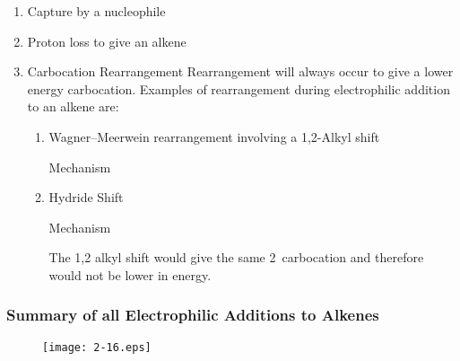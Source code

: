 \begin{enumerate}[label=\alph*)]

  \item Capture by a nucleophile

  \item Proton loss to give an alkene

  \item Carbocation Rearrangement
    Rearrangement will always occur to give a lower energy carbocation. Examples
    of rearrangement during electrophilic addition to an alkene are:

    \begin{enumerate}[label=\roman*)]

      \item Wagner--Meerwein rearrangement involving a 1,2-Alkyl shift


        Mechanism


      \item Hydride Shift


        Mechanism


        The 1,2 alkyl shift would give the same 2\de\ carbocation and therefore
        would not be lower in energy.
    \end{enumerate}

\end{enumerate}

\pagebreak %

\thispagestyle{empty} %

\begin{landscape}
  \subsubsection{Summary of all Electrophilic Additions to Alkenes}


  \vspace*{\fill}
  \begin{figure}[H]
    \centering
    \texttt{[image: 2-16.eps]}
  \end{figure}
  \vspace*{\fill}

\end{landscape}

